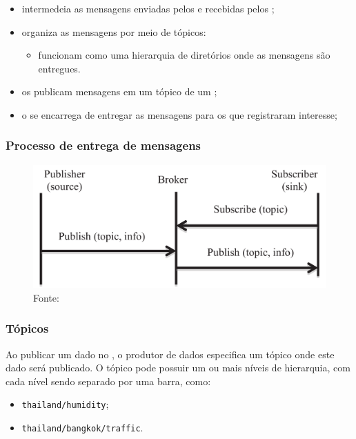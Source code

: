 \documentclass[aspectratio=169]{beamer}
\begin{document}
\begin{frame}
	\frametitle{\Broker}
	\begin{itemize}
		\item intermedeia as mensagens enviadas pelos \pubs e recebidas pelos \subs;

		\item organiza as mensagens por meio de tópicos:
			\begin{itemize}
				\item funcionam como uma hierarquia de diretórios onde as mensagens são entregues.
			\end{itemize}

		\item os \pubs publicam mensagens em um tópico de um \broker;

		\item o \broker se encarrega de entregar as mensagens para os \subs que registraram interesse;
	\end{itemize}
\end{frame}

\begin{frame}
	\frametitle{Processo de entrega de mensagens \mqtt}
	\begin{figure}
		\centering
		\includegraphics[width=.70\linewidth]{img/mqtt-sequence.png}
		\caption{Fonte:\cite{al-fuqaha:et-al:2015}}
	\end{figure}
\end{frame}

\begin{frame}
	\frametitle{Tópicos \mqtt}
	Ao publicar um dado no \broker \mqtt, o produtor de dados especifica um tópico onde este dado será publicado.
	O tópico pode possuir um ou mais níveis de hierarquia, com cada nível sendo separado por uma barra, como:
	\begin{itemize}
		\item \texttt{thailand/humidity};
		\item \texttt{thailand/bangkok/traffic}.
	\end{itemize}
\end{frame}
\end{document}
